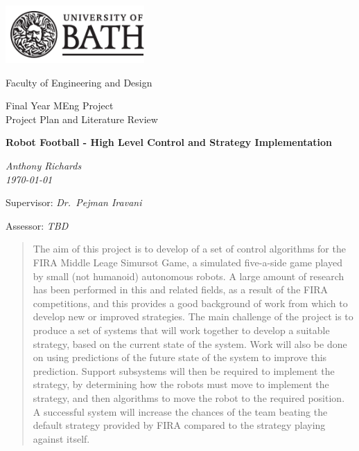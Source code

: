 \documentclass[a4paper,10pt]{article}
\begin{document}
\begin{titlepage}
  \setlength{\parindent}{0cm}

  \includegraphics[width=200px]{Images/uob-logo-black-transparent}

  \Large
  Faculty of Engineering and Design

  \vspace{80pt}

  \LARGE
  Final Year MEng Project \\
  Project Plan and Literature Review

  \vspace{80pt}
  \textbf{Robot Football - High Level Control and Strategy Implementation}

  \vspace{10pt}
  \emph{Anthony Richards} \\
  \emph{\today}

  \vspace{80pt}
  Supervisor: \emph{Dr.~Pejman Iravani}

  \vspace{10pt}
  Assessor: \emph{TBD}
\end{titlepage}


\begin{abstract}
\acresetall
The aim of this project is to develop of a set of control algorithms for the \ac{FIRA} Middle Leage Simursot Game, a simulated five-a-side game played by small (not humanoid) autonomous robots.  A large amount of research has been performed in this and related fields, as a result of the \ac{FIRA} competitions, and this provides a good background of work from which to develop new or improved strategies. The main challenge of the project is to produce a set of systems that will work together to develop a suitable strategy, based on the current state of the system.  Work will also be done on using predictions of the future state of the system to improve this prediction. Support subsystems will then be required to implement the strategy, by determining how the robots must move to implement the strategy, and then algorithms to move the robot to the required position. A successful system will increase the chances of the team beating the default strategy provided by \ac{FIRA} compared to the strategy playing against itself.
\end{abstract}
\end{document}
